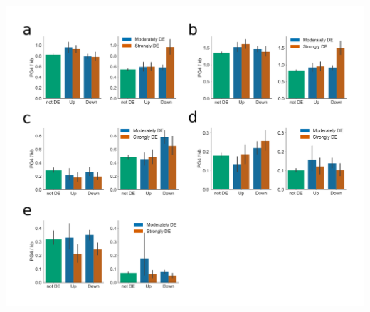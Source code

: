 \documentclass[12pt,a4paper,]{report}
\let\origfigure=\figure
\let\endorigfigure=\endfigure
\renewenvironment{figure}[1][2] {
    \expandafter\origfigure\expandafter[H]
} {
    \endorigfigure
}
\begin{document}
\newpage

\begin{figure}[htbp]
\centering
\includegraphics[width=\textwidth,height=562pt,keepaspectratio]{chapter_5/figures/nmm_regulated_g4_distribution.png}
\caption[Distribution of PG4s in genes differentially regulated by NMM.]{\textbf{Distribution   of   PG4s   in   genes   differentially   regulated   by   NMM.}   Bar   plots   showing   the   average   PG4   densities   of   genes   up   or   downregulated   by   NMM,   for   \textbf{a)}   full   gene   body   (exons   and   introns),   \textbf{b)}   coding   regions,   \textbf{c)}   5’   UTR,   \textbf{d)}   3’   UTR,   and   \textbf{e)}   introns,   respectively.   In   each   figure,   left   and   right   panels   represent   coding   and   template   strand,   respectively.   Genesets   are   separated   into   three   categories   by   strength   of   regulation:   green:   not   differentially   expressed,   blue:   moderately   differentially   expressed   (PPLR   <   0.05,   logFC   >   0.5),   orange:   strongly   differentially   expressed   (PPLR   <   0.05,   logFC   >   1).   Errorbars   are   68\%   confidence   intervals   for   mean   generated   using   1000   bootstrapped   samples.   Genes   which   are   strongly   downregulated   by   NMM   tend   to   have   higher   PG4   densities   on   the   template   strand   of   coding   regions   and   5’   UTRs,   whilst   moderately   downregulated   genes   tend   to   have   greater   PG4   density   on   the   template   strand   of   their   5’   UTRs.   \label{nmm_g4}}

\end{figure}
\end{document}
